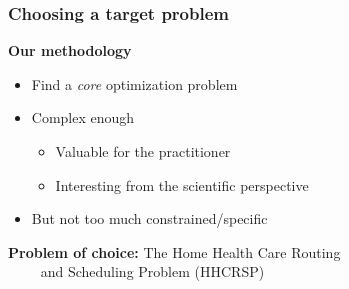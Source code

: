 \begin{frame}
   \frametitle{Choosing a target problem}

   \textbf{Our methodology}
   \begin{itemize}
      \item Find a \textit{core} optimization problem
      \item Complex enough
      \begin{itemize}
         \item Valuable for the practitioner
         \item Interesting from the scientific perspective
      \end{itemize}
      \item But not too much constrained/specific
   \end{itemize}

   \vspace*{18pt}
  \pause


   \textbf{Problem of choice: } The Home Health Care Routing \\
   \qquad \qquad \qquad \qquad ~~~~ and Scheduling Problem (HHCRSP)



\end{frame}

%

